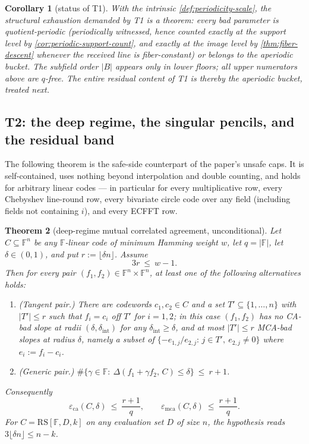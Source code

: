 \documentclass[11pt]{article}
\newtheorem{theorem}{Theorem}[section]
\newtheorem{corollary}[theorem]{Corollary}
\theoremstyle{definition}
\theoremstyle{remark}
\newcommand{\F}{\mathbb{F}}
\newcommand{\B}{B}
\newcommand{\RS}{\mathrm{RS}}
\newcommand{\eca}{\varepsilon_{\mathrm{ca}}}
\newcommand{\emca}{\varepsilon_{\mathrm{mca}}}
\newcommand{\dist}{\Delta}
\begin{document}
\begin{corollary}[status of T1]\label{cor:T1-status}
With the intrinsic \cref{def:periodicity-scale}, the structural exhaustion demanded by T1 is a theorem: every bad parameter is quotient-periodic \textup(periodically witnessed, hence counted exactly at the support level by \cref{cor:periodic-support-count}, and exactly at the image level by \cref{thm:fiber-descent} whenever the received line is fiber-constant\textup) or belongs to the aperiodic bucket. The subfield order $|\B|$ appears only in lower floors; all upper numerators above are $q$-free. The entire residual content of T1 is thereby the aperiodic bucket, treated next.
\end{corollary}

\subsection{T2: the deep regime, the singular pencils, and the residual band}\label{sec:discharge-T2}

The following theorem is the safe-side counterpart of the paper's unsafe caps. It is self-contained, uses nothing beyond interpolation and double counting, and holds for arbitrary linear codes --- in particular for every multiplicative row, every Chebyshev line-round row, every bivariate circle code over any field \textup(including fields not containing $i$\textup), and every ECFFT row.

\begin{theorem}[deep-regime mutual correlated agreement, unconditional]\label{thm:deep-mca}
Let $C\subseteq\F^n$ be any $\F$-linear code of minimum Hamming weight $w$, let $q=|\F|$, let $\delta\in(0,1)$, and put $r:=\lfloor\delta n\rfloor$. Assume
\[
3r\ \le\ w-1 .
\]
Then for every pair $(f_1,f_2)\in\F^n\times\F^n$, at least one of the following alternatives holds:
\begin{enumerate}[label=\textup{(\alph*)}]
\item \textup{(Tangent pair.)} There are codewords $c_1,c_2\in C$ and a set $T'\subseteq\{1,\dots,n\}$ with $|T'|\le r$ such that $f_i=c_i$ off $T'$ for $i=1,2$; in this case $(f_1,f_2)$ has no CA-bad slope at radii $(\delta,\delta_{\mathrm{int}})$ for any $\delta_{\mathrm{int}}\ge\delta$, and at most $|T'|\le r$ MCA-bad slopes at radius $\delta$, namely a subset of $\{-e_{1,j}/e_{2,j}:\,j\in T',\ e_{2,j}\ne0\}$ where $e_i:=f_i-c_i$.
\item \textup{(Generic pair.)} $\#\{\gamma\in\F:\ \dist(f_1+\gamma f_2,\,C)\le\delta\}\ \le\ r+1$.
\end{enumerate}
Consequently
\[
\eca(C,\delta)\ \le\ \frac{r+1}q,
\qquad
\emca(C,\delta)\ \le\ \frac{r+1}q .
\]
For $C=\RS[\F,D,k]$ on any evaluation set $D$ of size $n$, the hypothesis reads $3\lfloor\delta n\rfloor\le n-k$.
\end{theorem}
\end{document}
